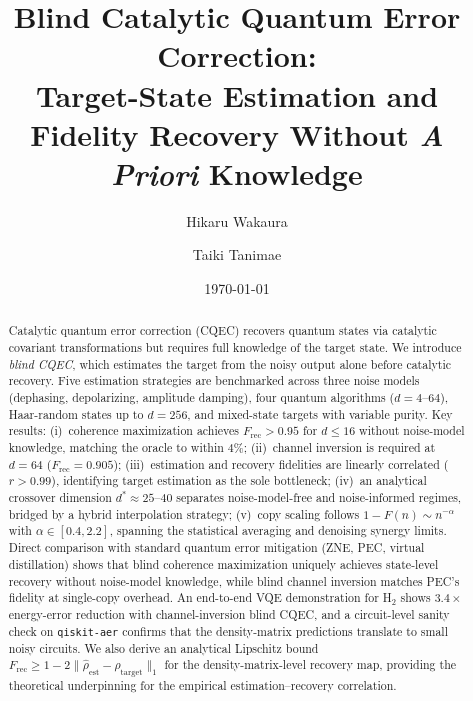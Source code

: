 \documentclass[prx,twocolumn,superscriptaddress,longbibliography,floatfix]{revtex4-2}
\newcommand{\Frec}{F_\mathrm{rec}}
\newcommand{\rhot}{\rho_\mathrm{target}}
\newcommand{\rhoe}{\hat{\rho}_\mathrm{est}}
\begin{document}
\title{Blind Catalytic Quantum Error Correction:\\
Target-State Estimation and Fidelity Recovery Without \textit{A Priori} Knowledge}

\author{Hikaru Wakaura}

\author{Taiki Tanimae}

\date{\today}

\begin{abstract}
Catalytic quantum error correction (CQEC) recovers quantum states via catalytic covariant transformations but requires full knowledge of the target state.
We introduce \emph{blind CQEC}, which estimates the target from the noisy output alone before catalytic recovery.
Five estimation strategies are benchmarked across three noise models (dephasing, depolarizing, amplitude damping), four quantum algorithms ($d = 4$--$64$), Haar-random states up to $d = 256$, and mixed-state targets with variable purity.
Key results: (i)~coherence maximization achieves $\Frec > 0.95$ for $d \leq 16$ without noise-model knowledge, matching the oracle to within $4\%$; (ii)~channel inversion is required at $d = 64$ ($\Frec = 0.905$); (iii)~estimation and recovery fidelities are linearly correlated ($r > 0.99$), identifying target estimation as the sole bottleneck; (iv)~an analytical crossover dimension $d^* \approx 25$--$40$ separates noise-model-free and noise-informed regimes, bridged by a hybrid interpolation strategy; (v)~copy scaling follows $1 - F(n) \sim n^{-\alpha}$ with $\alpha \in [0.4, 2.2]$, spanning the statistical averaging and denoising synergy limits.
Direct comparison with standard quantum error mitigation (ZNE, PEC, virtual distillation) shows that blind coherence maximization uniquely achieves state-level recovery without noise-model knowledge, while blind channel inversion matches PEC's fidelity at single-copy overhead.
An end-to-end VQE demonstration for H$_2$ shows $3.4\times$ energy-error reduction with channel-inversion blind CQEC, and a circuit-level sanity check on \texttt{qiskit-aer} confirms that the density-matrix predictions translate to small noisy circuits.
We also derive an analytical Lipschitz bound $\Frec \geq 1 - 2\|\rhoe - \rhot\|_1$ for the density-matrix-level recovery map, providing the theoretical underpinning for the empirical estimation--recovery correlation.
\end{abstract}
\end{document}
